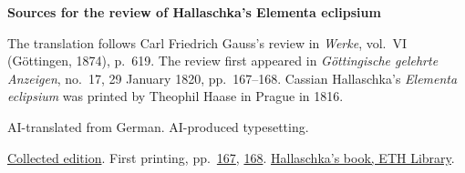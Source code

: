 \clearpage\thispagestyle{empty}
\begin{center}\Large\bfseries Sources for the review of Hallaschka’s Elementa eclipsium\end{center}

The translation follows Carl Friedrich Gauss’s review in \emph{Werke}, vol.~VI (Göttingen, 1874), p.~619. The review first appeared in \emph{Göttingische gelehrte Anzeigen}, no.~17, 29 January 1820, pp.~167--168. Cassian Hallaschka’s \emph{Elementa eclipsium} was printed by Theophil Haase in Prague in 1816.

AI-translated from German. AI-produced typesetting.

\href{https://gdz.sub.uni-goettingen.de/id/PPN236007467}{Collected edition}. First printing, pp.~\href{https://images.p.sub.uni-goettingen.de/iiif/image/gdz:PPN319721507_1820:00000161/full/1650,/0/default.jpg}{167}, \href{https://images.p.sub.uni-goettingen.de/iiif/image/gdz:PPN319721507_1820:00000162/full/1650,/0/default.jpg}{168}. \href{https://www.e-rara.ch/zut/content/titleinfo/5216006}{Hallaschka’s book, ETH Library}.

\clearpage
